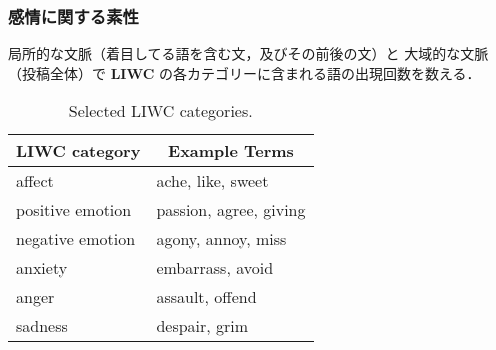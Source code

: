 \documentclass[11pt,usepdftitle=false]{beamer}
\newcommand\metaphorical[1]{\textcolor{sRed}{\textbf{#1}}}
\newcommand\tableheader[1]{\multicolumn{1}{c}{\textbf{#1}}}
\let\oldcitep=\citep
\renewcommand\citep[1]{\hyperlink{#1}{\oldcitep{#1}}}
\begin{document}
\begin{frame}
    \frametitle{感情に関する素性}
    局所的な文脈（着目してる語を含む文，及びその前後の文）と
    大域的な文脈（投稿全体）で
    \textbf{LIWC} \citep{tausczik2010}
    の各カテゴリーに含まれる語の出現回数を数える．
    \begingroup
    \small
    \begin{table}
        \caption{Selected LIWC categories.}
        \begin{tabular}{ll}
            \toprule
            \tableheader{LIWC category} & \tableheader{Example Terms} \\
            \midrule
            affect               & ache, like, sweet      \\
            positive emotion     & passion, agree, giving \\
            negative emotion     & agony, annoy, miss     \\
            anxiety              & embarrass, avoid       \\
            anger                & assault, offend        \\
            sadness              & despair, grim          \\
            \bottomrule
        \end{tabular}
    \end{table}
    \endgroup
\end{frame}
\end{document}
